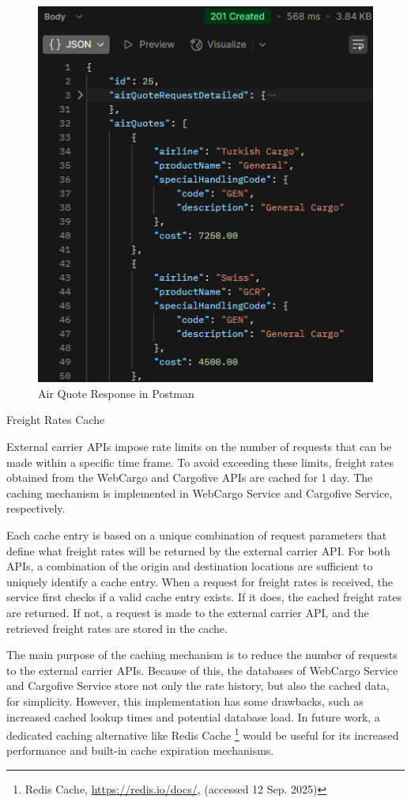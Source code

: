 \documentclass[12pt,reqno, oneside]{amsbook}
\makeatletter
\def\subsection{\@startsection{subsection}{2}%
      \z@{.5\linespacing\@plus.7\linespacing}{.25\linespacing}%
      {\normalfont\bfseries\flushleft}}
\theoremstyle{definition}
\theoremstyle{definition}
\numberwithin{section}{chapter}
\numberwithin{table}{chapter}
\numberwithin{figure}{chapter}
\makeatother
\begin{document}
\begin{figure}[H]
  \centering
  \includegraphics[width=0.7\linewidth]{images/AirQuoteResponsePostman.png}
  \caption{\label{Figure:AirQuoteResponsePostman}Air Quote Response in Postman}
\end{figure}

\subsection{Freight Rates Cache}

External carrier \acp{API} impose rate limits on the number of requests that can be made within a specific time frame. To avoid exceeding these limits, freight rates obtained from the WebCargo and Cargofive \Acp{API} are cached for 1 day. The caching mechanism is implemented in WebCargo Service and Cargofive Service, respectively.

Each cache entry is based on a unique combination of request parameters that define what freight rates will be returned by the external carrier \ac{API}. For both \acp{API}, a combination of the origin and destination locations are sufficient to uniquely identify a cache entry. When a request for freight rates is received, the service first checks if a valid cache entry exists. If it does, the cached freight rates are returned. If not, a request is made to the external carrier \ac{API}, and the retrieved freight rates are stored in the cache.

The main purpose of the caching mechanism is to reduce the number of requests to the external carrier \acp{API}. Because of this, the databases of WebCargo Service and Cargofive Service store not only the rate history, but also the cached data, for simplicity. However, this implementation has some drawbacks, such as increased cached lookup times and potential database load. In future work, a dedicated caching alternative like Redis Cache \footnote{Redis Cache, \url{https://redis.io/docs/}, (accessed 12 Sep. 2025)} would be useful for its increased performance and built-in cache expiration mechanisms.
\end{document}
